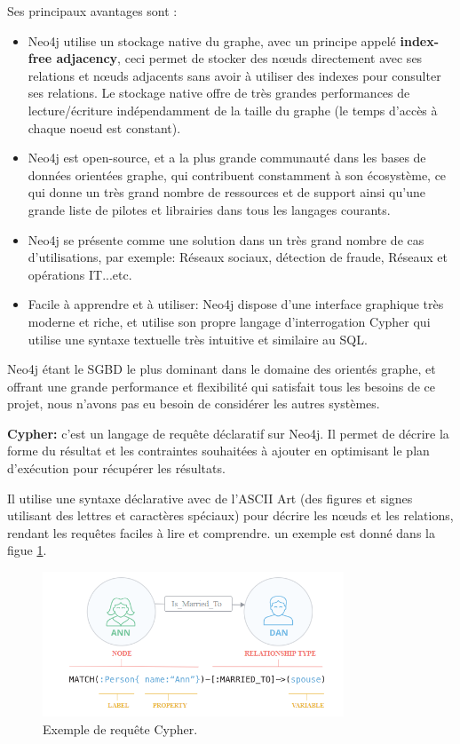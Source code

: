 Ses principaux avantages sont :
\begin{itemize}
	\item Neo4j utilise un stockage native du graphe, avec un principe appelé \textbf{index-free adjacency}, ceci permet de stocker des nœuds directement avec ses relations et nœuds adjacents sans avoir à utiliser des indexes pour consulter ses relations.\newline
	Le stockage native offre de très grandes performances de lecture/écriture indépendamment de la taille du graphe (le temps d'accès à chaque noeud est constant).
	\item Neo4j est open-source, et a la plus grande communauté dans les bases de données orientées graphe, qui contribuent constamment à son écosystème, ce qui donne un très grand nombre de ressources et de support ainsi qu'une grande liste de pilotes et librairies dans tous les langages courants.
	\item Neo4j se présente comme une solution dans un très grand nombre de cas d'utilisations, par exemple: Réseaux sociaux, détection de fraude, Réseaux et opérations IT...etc.
	\item Facile à apprendre et à utiliser: Neo4j dispose d'une interface graphique très moderne et riche, et utilise son propre langage d'interrogation Cypher qui utilise une syntaxe textuelle très intuitive et similaire au SQL.
\end{itemize}

Neo4j étant le SGBD le plus dominant dans le domaine des orientés graphe, et offrant une grande performance et flexibilité qui satisfait tous les besoins de ce projet, nous n'avons pas eu besoin de considérer les autres systèmes.

\textbf{Cypher: } c'est un langage de requête déclaratif sur Neo4j. Il permet de décrire la forme du résultat et les contraintes souhaitées à ajouter en optimisant le plan d'exécution pour récupérer les résultats.\newline

Il utilise une syntaxe déclarative avec de l'ASCII Art (des figures et signes utilisant des lettres et caractères spéciaux) pour décrire les nœuds et les relations, rendant les requêtes faciles à lire et comprendre. un exemple est donné dans la figue \ref{fig:cypher}.

\begin{figure}
	\center
	\includegraphics[width=0.8\textwidth]{img/cypher.png}
	\caption{Exemple de requête Cypher.}
	\label{fig:cypher}
\end{figure}

